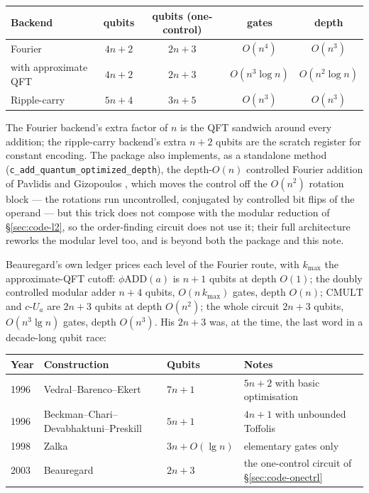 \documentclass[11pt]{article}
\newcommand{\CMULT}{\mathrm{CMULT}}
\newcommand{\code}[1]{\texttt{#1}}
\theoremstyle{plain}
\theoremstyle{remark}
\begin{document}
\begin{center}
\begin{tabular}{@{}lcccc@{}}
\toprule
Backend & qubits & qubits (one-control) & gates & depth\\
\midrule
Fourier \cite{draper,beauregard} & $4n+2$ & $2n+3$ & $O(n^4)$ & $O(n^3)$\\
\quad with approximate QFT \cite{barenco-aqft,cheung} & $4n+2$ & $2n+3$ & $O(n^3\log n)$ & $O(n^2\log n)$\\
Ripple-carry \cite{cuccaro} & $5n+4$ & $3n+5$ & $O(n^3)$ & $O(n^3)$\\
\bottomrule
\end{tabular}
\end{center}

\medskip\noindent
The Fourier backend's extra factor of $n$ is the QFT sandwich around every addition; the
ripple-carry backend's extra $n{+}2$ qubits are the scratch register for constant encoding. The
package also implements, as a standalone method (\code{c\_add\_quantum\_optimized\_depth}), the
depth-$O(n)$ controlled Fourier addition of Pavlidis and Gizopoulos \cite{pavlidis}, which moves
the control off the $O(n^2)$ rotation block --- the rotations run uncontrolled, conjugated by
controlled bit flips of the operand --- but this trick does not compose with the modular reduction
of \S\ref{sec:code-l2}, so the order-finding circuit does not use it; their full architecture
reworks the modular level too, and is beyond both the package and this note.

Beauregard's own ledger \cite{beauregard} prices each level of the Fourier route, with
$k_{\max}$ the approximate-QFT cutoff: $\phi\mathrm{ADD}(a)$ is $n{+}1$ qubits at depth $O(1)$;
the doubly controlled modular adder $n{+}4$ qubits, $O(n\,k_{\max})$ gates, depth $O(n)$;
$\CMULT$ and $c\text{-}U_a$ are $2n{+}3$ qubits at depth $O(n^2)$; the whole circuit $2n{+}3$
qubits, $O(n^3\lg n)$ gates, depth $O(n^3)$. His $2n+3$ was, at the time, the last word in a
decade-long qubit race:

\begin{center}\small
\begin{tabular}{@{}llll@{}}
\toprule
Year & Construction & Qubits & Notes\\
\midrule
1996 & Vedral--Barenco--Ekert \cite{vbe} & $7n+1$ & $5n+2$ with basic optimisation\\
1996 & Beckman--Chari--Devabhaktuni--Preskill \cite{bcdp} & $5n+1$ & $4n+1$ with unbounded Toffolis\\
1998 & Zalka \cite{zalka} & $3n+O(\lg n)$ & elementary gates only\\
2003 & Beauregard \cite{beauregard} & $2n+3$ & the one-control circuit of \S\ref{sec:code-onectrl}\\
\bottomrule
\end{tabular}
\end{center}
\end{document}
